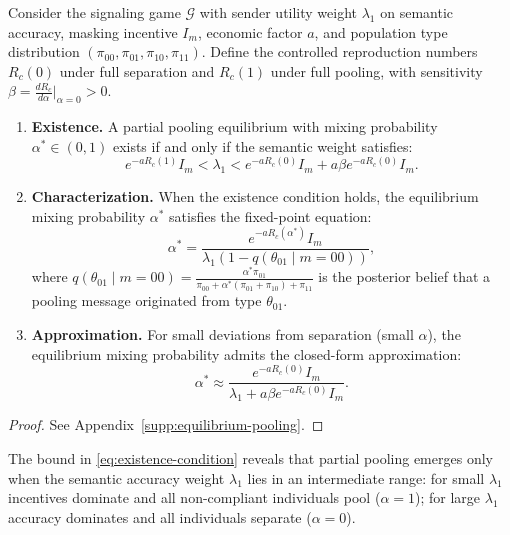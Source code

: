 \documentclass[sigconf,review]{acmart}
\begin{document}
\begin{theorem}
\label{thm:partial-pooling}
Consider the signaling game $\mathcal{G}$ with sender utility weight $\lambda_1$ on semantic accuracy, masking incentive $I_m$, economic factor $a$, and population type distribution $(\pi_{00}, \pi_{01}, \pi_{10}, \pi_{11})$. Define the controlled reproduction numbers $R_c(0)$ under full separation and $R_c(1)$ under full pooling, with sensitivity $\beta = \frac{dR_c}{d\alpha}\big|_{\alpha=0} > 0$.

\begin{enumerate}
    \item \textbf{Existence.} A partial pooling equilibrium with mixing probability $\alpha^* \in (0,1)$ exists if and only if the semantic weight satisfies:
    \begin{equation}
        e^{-aR_c(1)} I_m < \lambda_1 < e^{-aR_c(0)} I_m + a\beta e^{-aR_c(0)} I_m.
        \label{eq:existence-condition}
    \end{equation}

    \item \textbf{Characterization.} When the existence condition holds, the equilibrium mixing probability $\alpha^*$ satisfies the fixed-point equation:
    \begin{equation}
        \alpha^* = \frac{e^{-aR_c(\alpha^*)} I_m}{\lambda_1 \left(1 - q(\theta_{01} \mid m = 00)\right)},
        \label{eq:fixed-point}
    \end{equation}
    where $q(\theta_{01} \mid m = 00) = \frac{\alpha^* \pi_{01}}{\pi_{00} + \alpha^*(\pi_{01} + \pi_{10}) + \pi_{11}}$ is the posterior belief that a pooling message originated from type $\theta_{01}$.
    
    \item \textbf{Approximation.} For small deviations from separation (small $\alpha$), the equilibrium mixing probability admits the closed-form approximation:
    \begin{equation}
        \alpha^* \approx \frac{e^{-aR_c(0)} I_m}{\lambda_1 + a\beta e^{-aR_c(0)} I_m}.
        \label{eq:alpha-approx}
    \end{equation}
\end{enumerate}
\end{theorem}

\begin{proof}
See Appendix~\ref{supp:equilibrium-pooling}.
\end{proof}
The bound in  \eqref{eq:existence-condition} reveals that partial pooling emerges only when the semantic accuracy weight $\lambda_1$ lies in an intermediate range: for small $\lambda_1$ incentives dominate and all non-compliant individuals pool ($\alpha=1$); for large $\lambda_1$ accuracy dominates and all individuals separate ($\alpha=0$). %
\end{document}
